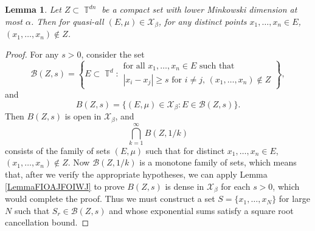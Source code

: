 \documentclass[dvipsnames,letterpaper,12pt]{article}
\numberwithin{equation}{section}
\DeclareMathOperator{\TT}{\mathbb{T}}
\newtheorem{lemma}[theorem]{Lemma}
\numberwithin{theorem}{section}
\begin{document}
\begin{lemma} \label{LemmaVIVIJCIJSIJ}
    Let $Z \subset \TT^{dn}$ be a compact set with lower Minkowski dimension at most $\alpha$. Then for quasi-all $(E,\mu) \in \mathcal{X}_\beta$, for any distinct points $x_1, \dots, x_n \in E$, $(x_1, \dots, x_n) \not \in Z$.
\end{lemma}
\begin{proof}
    For any $s > 0$, consider the set
    \[ \mathcal{B}(Z,s) = \left\{ E \subset \TT^d: \begin{array}{c}
            \text{for all $x_1, \dots, x_n \in E$ such that}\\
            \text{$|x_i - x_j| \geq s$ for $i \neq j$, $(x_1, \dots, x_n) \not \in Z$}
        \end{array} \right\}, \]
    and
    \[ B(Z,s) = \{ (E,\mu) \in \mathcal{X}_\beta: E \in \mathcal{B}(Z,s) \}. \]
    Then $B(Z,s)$ is open in $\mathcal{X}_\beta$, and
    \begin{equation}
        \bigcap_{k = 1}^\infty B(Z,1/k)
    \end{equation}
    consists of the family of sets $(E,\mu)$ such that for distinct $x_1, \dots, x_n \in E$, $(x_1, \dots, x_n) \not \in Z$. Now $\mathcal{B}(Z,1/k)$ is a monotone family of sets, which means that, after we verify the appropriate hypotheses, we can apply Lemma \ref{LemmaFIOAJFOIWJ} to prove $B(Z,s)$ is dense in $\mathcal{X}_\beta$ for each $s > 0$, which would complete the proof. Thus we must construct a set $S = \{ x_1, \dots, x_N \}$ for large $N$ such that $S_r \in \mathcal{B}(Z,s)$ and whose exponential sums satisfy a square root cancellation bound.


\end{proof}
\end{document}
